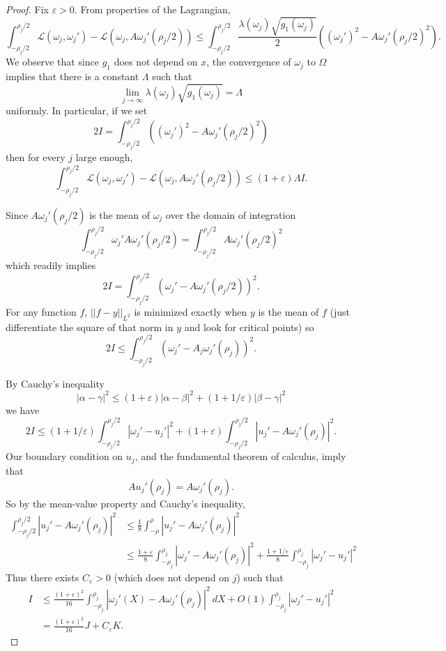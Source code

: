 \documentclass[reqno,12pt,letterpaper]{amsart}
\newcommand{\Lagrange}{\mathscr L}
\theoremstyle{definition}
\numberwithin{equation}{section}
\begin{document}
\begin{proof}
Fix $\varepsilon > 0$.
From properties of the Lagrangian,
$$\int_{-\rho_j/2}^{\rho_j/2} \Lagrange(\omega_j, \omega_j') - \Lagrange(\omega_j, A \omega_j'(\rho_j/2)) \leq \int_{-\rho_j/2}^{\rho_j/2} \frac{\lambda(\omega_j) \sqrt{g_1(\omega_j)}}{2} ((\omega_j')^2 - A \omega_j'(\rho_j/2)^2).$$
We observe that since $g_1$ does not depend on $x$, the convergence of $\omega_j$ to $\Omega$ implies that there is a constant $\Lambda$ such that
$$\lim_{j \to \infty} \lambda(\omega_j) \sqrt{g_1(\omega_j)} = \Lambda$$
uniformly.
In particular, if we set
$$2I = \int_{-\rho_j/2}^{\rho_j/2} ((\omega_j')^2 - A \omega_j'(\rho_j/2)^2)$$
then for every $j$ large enough,
$$\int_{-\rho_j/2}^{\rho_j/2} \Lagrange(\omega_j, \omega_j') - \Lagrange(\omega_j, A \omega_j'(\rho_j/2)) \leq (1 + \varepsilon) \Lambda I.$$

Since $A \omega_j'(\rho_j/2)$ is the mean of $\omega_j$ over the domain of integration
$$\int_{-\rho_j/2}^{\rho_j/2} \omega_j' A\omega_j'(\rho_j/2) = \int_{-\rho_j/2}^{\rho_j/2} A \omega_j'(\rho_j/2)^2$$
which readily implies
$$2I = \int_{-\rho_j/2}^{\rho_j/2} (\omega_j' -  A \omega_j'(\rho_j/2))^2.$$
For any function $f$, $||f - y||_{L^2}$ is minimized exactly when $y$ is the mean of $f$ (just differentiate the square of that norm in $y$ and look for critical points) so
$$2I \leq \int_{-\rho_j/2}^{\rho_j/2} (\omega_j' -  A_j \omega_j'(\rho_j))^2.$$

By Cauchy's inequality
$$|\alpha - \gamma|^2 \leq (1 + \varepsilon) |\alpha - \beta|^2 + (1 + 1/\varepsilon) |\beta - \gamma|^2$$
we have
$$2I \leq (1 + 1/\varepsilon) \int_{-\rho_j/2}^{\rho_j/2} |\omega_j' - u_j'|^2 + (1 + \varepsilon) \int_{-\rho_j/2}^{\rho_j/2} |u_j' - A\omega_j'(\rho_j)|^2.$$
Our boundary condition on $u_j$, and the fundamental theorem of calculus, imply that
$$A u_j'(\rho_j) = A\omega_j'(\rho_j).$$
So by the mean-value property and Cauchy's inequality,
\begin{align*}
\int_{-\rho_j/2}^{\rho_j/2} |u_j' -  A \omega_j'(\rho_j)|^2 &\leq \frac{1}{8} \int_{-\rho}^{\rho} |u_j' -  A \omega_j'(\rho_j)|^2\\
&\leq \frac{1 + \varepsilon}{8} \int_{-\rho_j}^{\rho_j} |\omega_j' -  A \omega_j'(\rho_j)|^2 + \frac{1 + 1/\varepsilon}{8} \int_{-\rho_j}^{\rho_j} |\omega_j' - u_j'|^2
\end{align*}
Thus there exists $C_\varepsilon > 0$ (which does not depend on $j$) such that
\begin{align*}
I &\leq \frac{(1 + \varepsilon)^2}{16} \int_{-\rho_j}^{\rho_j} |\omega_j'(X) -  A \omega_j'(\rho_j)|^2 ~dX + O(1) \int_{-\rho_j}^{\rho_j} |\omega_j' - u_j'|^2\\
&= \frac{(1 + \varepsilon)^2}{16} J + C_\varepsilon K.
\end{align*}


\end{proof}
\end{document}
